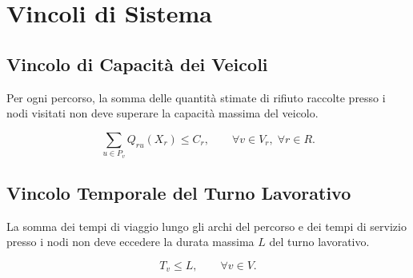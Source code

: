 \section{Vincoli di Sistema}

\subsection{Vincolo di Capacità dei Veicoli}

Per ogni percorso, la somma delle quantità stimate di rifiuto raccolte presso i nodi visitati non deve superare la capacità massima del veicolo.

\begin{equation}
	\sum_{u \in P_v} Q_{ru}(X_r) \le C_r,
	\qquad \forall v \in V_r,\; \forall r \in R.
\end{equation}

\subsection{Vincolo Temporale del Turno Lavorativo}

La somma dei tempi di viaggio lungo gli archi del percorso e dei tempi di servizio presso i nodi non deve eccedere la durata massima $L$ del turno lavorativo.

\begin{equation}
	T_v \le L,
	\qquad \forall v \in V.
\end{equation}
